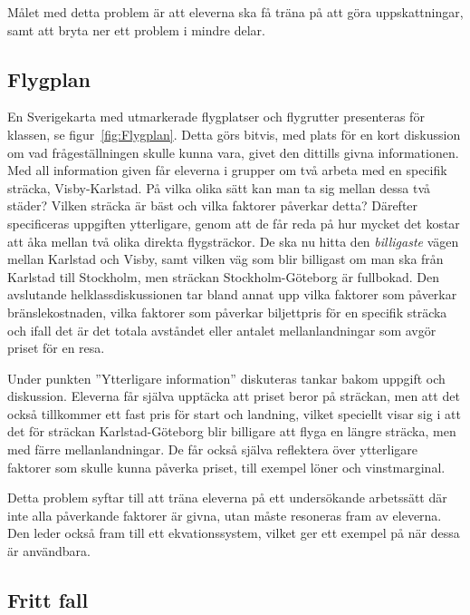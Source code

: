     \textcolor{lila}{Målet med detta problem är att eleverna ska få träna på att göra uppskattningar, samt att bryta ner ett problem i mindre delar.}
    
    

\subsection{Flygplan}
    \label{sec:Flygplan}
    
    \textcolor{lila}{En Sverigekarta med utmarkerade flygplatser och flygrutter presenteras för klassen, se figur~\ref{fig:Flygplan}. Detta görs bitvis, med plats för en kort diskussion om vad frågeställningen skulle kunna vara, givet den dittills givna informationen. Med all information given får eleverna i grupper om två arbeta med en specifik sträcka, Visby-Karlstad. På vilka olika sätt kan man ta sig mellan dessa två städer? Vilken sträcka är bäst och vilka faktorer påverkar detta? Därefter specificeras uppgiften ytterligare, genom att de får reda på hur mycket det kostar att åka mellan två olika direkta flygsträckor. De ska nu hitta den \textsl{billigaste} vägen mellan Karlstad och Visby, samt vilken väg som blir billigast om man ska från Karlstad till Stockholm, men sträckan Stockholm-Göteborg är fullbokad. Den avslutande helklassdiskussionen tar bland annat upp vilka faktorer som påverkar bränslekostnaden, vilka faktorer som påverkar biljettpris för en specifik sträcka och ifall det är det totala avståndet eller antalet mellanlandningar som avgör priset för en resa.}
    
    \textcolor{lila}{Under punkten ''Ytterligare information'' diskuteras tankar bakom uppgift och diskussion. Eleverna får själva upptäcka att priset beror på sträckan, men att det också tillkommer ett fast pris för start och landning, vilket speciellt visar sig i att det för sträckan Karlstad-Göteborg blir billigare att flyga en längre sträcka, men med färre mellanlandningar. De får också själva reflektera över ytterligare faktorer som skulle kunna påverka priset, till exempel löner och vinstmarginal.}
    
    \textcolor{lila}{Detta  problem syftar till att träna eleverna på ett undersökande arbetssätt där inte alla påverkande faktorer är givna, utan måste resoneras fram av eleverna. Den leder också fram till ett ekvationssystem, vilket ger ett exempel på när dessa är användbara.}
    
    
    
\subsection{Fritt fall}
    \label{sec:FrittFall}
    
